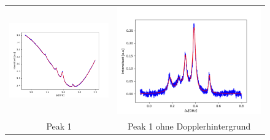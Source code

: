 \documentclass[a4paper,parskip]{scrartcl}
\begin{document}
\begin{figure}[p]
\centering
\begin{tabular}{cc}
    \includegraphics[scale = 0.45]{./saturation/peak1/fit.png}  &  \includegraphics[scale = 0.45]{./saturation/peak1/gaussCorrected.png}  \\
    {\footnotesize Peak 1} & {\footnotesize Peak 1 ohne Dopplerhintergrund}  \\

\end{tabular}
\end{figure}
\end{document}
